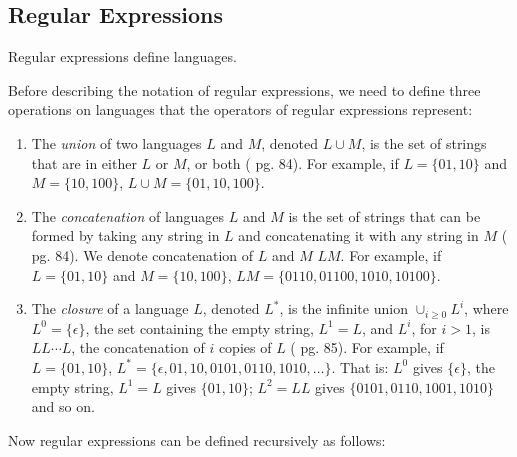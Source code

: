 \documentclass[a4paper,oneside,11pt]{book}
\theoremstyle{definition}
\begin{document}
\subsection{Regular Expressions}

Regular expressions define languages.

Before describing the notation of regular expressions,
we need to define three operations on languages that the operators of regular expressions represent:

\begin{enumerate}

\item
The \emph{union} of two languages $L$ and $M$, denoted $L \cup M$, is the set of strings that are in
either $L$ or $M$, or both (\cite{AUTOMATA} pg. 84).
For example, if $L = \{01, 10\}$ and $M = \{10, 100\}$, $L \cup M = \{01, 10, 100\}$.

\item
The \emph{concatenation} of languages $L$ and $M$ is the set of strings that can be formed by taking
any string in $L$ and concatenating it with any string in $M$ (\cite{AUTOMATA} pg. 84).
We denote concatenation of $L$ and $M$ $LM$.
For example, if $L = \{01, 10\}$ and $M = \{10, 100\}$, $LM = \{0110, 01100, 1010, 10100\}$.

\item
The \emph{closure} of a language $L$, denoted $L^*$, is the infinite union $\cup _{i\ge0}L^i$,
where $L^0 = \{\epsilon\}$, the set containing the empty string, $L^1 = L$, and
$L^i$, for $i > 1$, is $LL \cdots L$, the concatenation of $i$ copies of $L$ (\cite{AUTOMATA} pg. 85).
For example, if $L = \{01, 10\}$, $L^* = \{\epsilon, 01, 10, 0101, 0110, 1010, \ldots\}$.
That is: $L^0$ gives $\{\epsilon\}$, the empty string, $L^1 = L$ gives $\{01, 10\}$;
$L^2 = LL$ gives $\{0101, 0110, 1001, 1010\}$ and so on.

\end{enumerate}

Now regular expressions can be defined recursively as follows:
\end{document}
